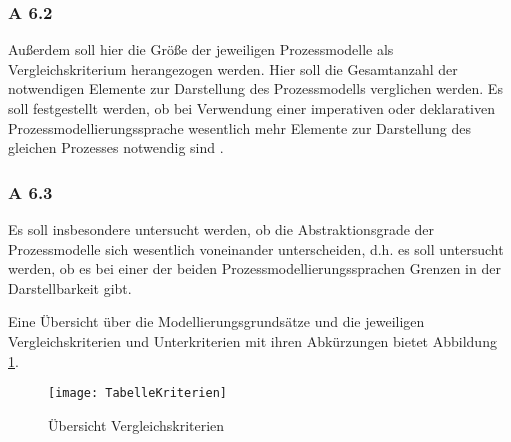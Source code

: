 \subsubsection{A 6.2}
Außerdem soll hier die Größe der jeweiligen Prozessmodelle als Vergleichskriterium herangezogen werden. Hier soll die Gesamtanzahl der notwendigen Elemente zur Darstellung des Prozessmodells verglichen werden. Es soll festgestellt werden, ob bei Verwendung einer imperativen oder deklarativen Prozessmodellierungssprache wesentlich mehr Elemente zur Darstellung des gleichen Prozesses notwendig sind \cite{leimeister2012, journals95, freund2007,reinshagen2009}.

 \subsubsection{A 6.3}
Es soll insbesondere untersucht werden, ob die Abstraktionsgrade der Prozessmodelle sich wesentlich voneinander unterscheiden, d.h. es soll untersucht werden, ob es bei einer der beiden Prozessmodellierungssprachen Grenzen in der Darstellbarkeit gibt.


Eine Übersicht über die Modellierungsgrundsätze und die jeweiligen Vergleichskriterien und Unterkriterien mit ihren Abkürzungen bietet Abbildung \ref{fig:TabelleKriterien}.

\begin{figure}[!htbp]
\begin{center}
  \texttt{[image: TabelleKriterien]} %
  \caption{Übersicht Vergleichskriterien}
  \label{fig:TabelleKriterien}
\end{center}
\end{figure}









